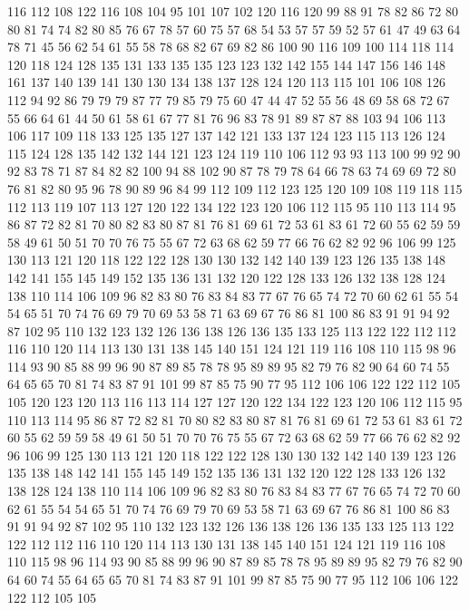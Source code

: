 116 112 108 122 116 108 104 95 101 107 102 120 116 120 99 88 91 78 82 86
72 80 80 81 74 74 82 80 85 76 67 78 57 60 75 57 68 54 53 57
57 59 52 57 61 47 49 63 64 78 71 45 56 62 54 61 55 58 78 68
82 67 69 82 86 100 90 116 109 100 114 118 114 120 118 124 128 135 131 133
135 135 123 123 132 142 155 144 147 156 146 148 161 137 140 139 141 130 130 134
138 137 128 124 120 113 115 101 106 108 126 112 94 92 86 79 79 79 87 77
79 85 79 75 60 47 44 47 52 55 56 48 69 58 68 72 67 55 66 64
61 44 50 61 58 61 67 77 81 76 96 83 78 91 89 87 87 88 103 94
106 113 106 117 109 118 133 125 135 127 137 142 121 133 137 124 123 115 113 126
124 115 124 128 135 142 132 144 121 123 124 119 110 106 112 93 93 113 100 99
92 90 92 83 78 71 87 84 82 82 100 94 88 102 90 87 78 79 78 64
66 78 63 74 69 69 72 80 76 81 82 80 95 96 78 90 89 96 84 99
112 109 112 123 125 120 109 108 119 118 115 112 113 119 107 113 127 120 122 134
122 123 120 106 112 115 95 110 113 114 95 86 87 72 82 81 70 80 82 83
80 87 81 76 81 69 61 72 53 61 83 61 72 60 55 62 59 59 58 49
61 50 51 70 70 76 75 55 67 72 63 68 62 59 77 66 76 62 82 92
96 106 99 125 130 113 121 120 118 122 122 128 130 130 132 142 140 139 123 126
135 138 148 142 141 155 145 149 152 135 136 131 132 120 122 128 133 126 132 138
128 124 138 110 114 106 109 96 82 83 80 76 83 84 83 77 67 76 65 74
72 70 60 62 61 55 54 54 65 51 70 74 76 69 79 70 69 53 58 71
63 69 67 76 86 81 100 86 83 91 91 94 92 87 102 95 110 132 123 132
126 136 138 126 136 135 133 125 113 122 122 112 112 116 110 120 114 113 130 131
138 145 140 151 124 121 119 116 108 110 115 98 96 114 93 90 85 88 99 96
90 87 89 85 78 78 95 89 89 95 82 79 76 82 90 64 60 74 55 64
65 65 70 81 74 83 87 91 101 99 87 85 75 90 77 95 112 106 106 122
122 112 105 105 120 123 120 113 116 113 114 127 127 120 122 134 122 123 120 106
112 115 95 110 113 114 95 86 87 72 82 81 70 80 82 83 80 87 81 76
81 69 61 72 53 61 83 61 72 60 55 62 59 59 58 49 61 50 51 70
70 76 75 55 67 72 63 68 62 59 77 66 76 62 82 92 96 106 99 125
130 113 121 120 118 122 122 128 130 130 132 142 140 139 123 126 135 138 148 142
141 155 145 149 152 135 136 131 132 120 122 128 133 126 132 138 128 124 138 110
114 106 109 96 82 83 80 76 83 84 83 77 67 76 65 74 72 70 60 62
61 55 54 54 65 51 70 74 76 69 79 70 69 53 58 71 63 69 67 76
86 81 100 86 83 91 91 94 92 87 102 95 110 132 123 132 126 136 138 126
136 135 133 125 113 122 122 112 112 116 110 120 114 113 130 131 138 145 140 151
124 121 119 116 108 110 115 98 96 114 93 90 85 88 99 96 90 87 89 85
78 78 95 89 89 95 82 79 76 82 90 64 60 74 55 64 65 65 70 81
74 83 87 91 101 99 87 85 75 90 77 95 112 106 106 122 122 112 105 105
